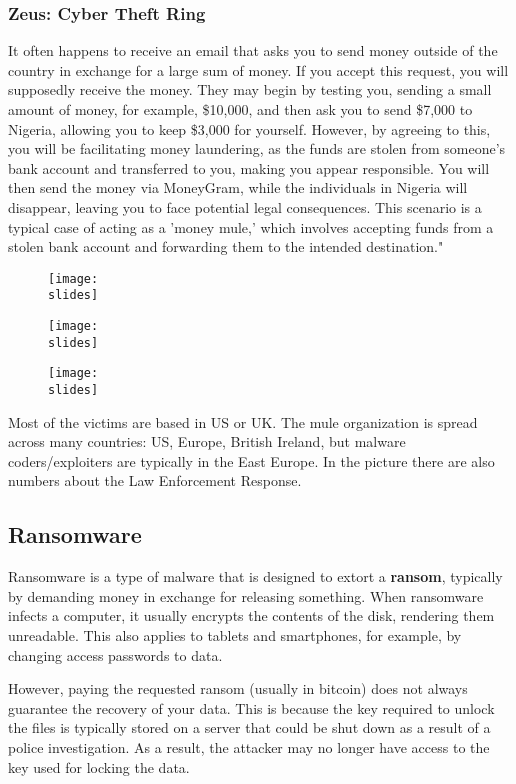 \subsubsection*{Zeus: Cyber Theft Ring}
It often happens to receive an email that asks you to send money outside of the country in exchange for a large sum of money.
If you accept this request, you will supposedly receive the money.
They may begin by testing you, sending a small amount of money, for example, \$10,000, and then ask you to send \$7,000 to Nigeria, allowing you to keep \$3,000 for yourself.
However, by agreeing to this, you will be facilitating money laundering, as the funds are stolen from someone's bank account and transferred to you, making you appear responsible.
You will then send the money via MoneyGram, while the individuals in Nigeria will disappear, leaving you to face potential legal consequences. This scenario is a typical case of acting as a 'money mule,' which involves accepting funds from a stolen bank account and forwarding them to the intended destination."
\begin{figure}[H]
  \centering

  \texttt{[image: \\slides]}

  \texttt{[image: \\slides]}

  \texttt{[image: \\slides]}
\end{figure}


Most of the victims are based in US or UK. The
mule organization is spread across many countries:
US, Europe, British Ireland, but malware
coders/exploiters are typically in the East Europe.
In the picture there are also numbers about the Law
Enforcement Response.

\subsection*{Ransomware}
Ransomware is a type of malware that is designed to extort a \textbf{ransom}, typically by demanding money in exchange for releasing something. When ransomware infects a computer, it usually encrypts the contents of the disk, rendering them unreadable. This also applies to tablets and smartphones, for example, by changing access passwords to data.

However, paying the requested ransom (usually in bitcoin) does not always guarantee the recovery of your data. This is because the key required to unlock the files is typically stored on a server that could be shut down as a result of a police investigation. As a result, the attacker may no longer have access to the key used for locking the data.


